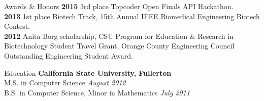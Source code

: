 \documentclass{resume} %
\begin{document}
\begin{rSection}{Awards \& Honors}
{\bf 2015}  3rd place Topcoder Open Finals API Hackathon. \\
{\bf 2013}  1st place Biotech Track, 15th Annual IEEE Biomedical Engineering Biotech Contest. \\
{\bf 2012} Anita Borg scholarship, CSU Program for Education \& Research in Biotechnology Student Travel Grant, Orange County Engineering Council Outstanding Engineering Student Award. \\
\end{rSection}


\begin{rSection}{Education}
{\bf California State University, Fullerton}  \\ 
M.S. in Computer Science \hfill {\em August 2012}\\
B.S. in Computer Science, Minor in Mathematics  \hfill {\em July 2011}\\
\end{rSection}






\end{document}
